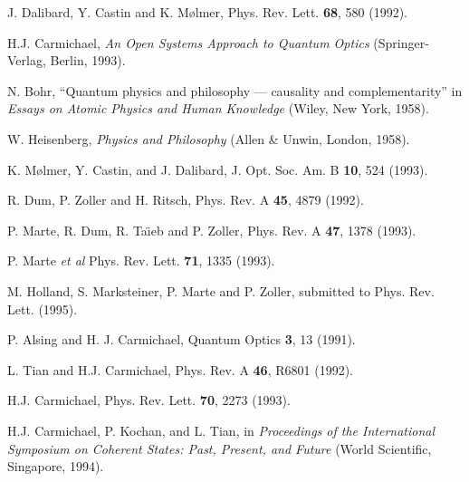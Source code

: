\documentclass[12pt]{article}
\begin{document}
\begin{thebibliography}{99}


J. Dalibard, Y. Castin and K. M\o lmer,
Phys. Rev. Lett. {\bf 68}, 580 (1992).

H.J. Carmichael,
{\em An Open Systems Approach to Quantum Optics}
(Springer-Verlag, Berlin, 1993).

N. Bohr,
``Quantum physics and philosophy --- causality and complementarity''
in {\em Essays on Atomic Physics and Human Knowledge}
(Wiley, New York, 1958).

W. Heisenberg,
{\em Physics and Philosophy}
(Allen \& Unwin, London, 1958).

K. M\o lmer, Y. Castin, and J. Dalibard,
J. Opt. Soc. Am. B {\bf 10}, 524 (1993).

R. Dum, P. Zoller and H. Ritsch,
Phys. Rev. A {\bf 45}, 4879 (1992).

P. Marte, R. Dum, R. Ta\"{\i}eb and P. Zoller,
Phys. Rev. A {\bf 47}, 1378 (1993).

P. Marte {\em et al}
Phys. Rev. Lett. {\bf 71}, 1335 (1993).

M. Holland, S. Marksteiner, P. Marte and P. Zoller,
submitted to Phys. Rev. Lett. (1995).

P. Alsing and H. J. Carmichael,
Quantum Optics {\bf 3}, 13 (1991).

L. Tian and H.J. Carmichael,
Phys. Rev. A {\bf 46}, R6801 (1992).

H.J. Carmichael,
Phys. Rev. Lett. {\bf 70}, 2273 (1993).

H.J. Carmichael, P. Kochan, and L. Tian,
in {\em Proceedings of the International Symposium on Coherent 
States: Past, Present, and Future}
(World Scientific, Singapore, 1994).


\end{thebibliography}
\end{document}
